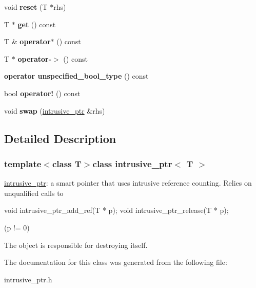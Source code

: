 \begin{DoxyCompactItemize}
\item 
\hypertarget{classintrusive__ptr_a81e2fb688afba02de9ecf2006caeb62e}{void {\bfseries reset} (T $\ast$rhs)}\label{classintrusive__ptr_a81e2fb688afba02de9ecf2006caeb62e}

\item 
\hypertarget{classintrusive__ptr_a70192c07e3ff5035942095a5d2d97c34}{T $\ast$ {\bfseries get} () const }\label{classintrusive__ptr_a70192c07e3ff5035942095a5d2d97c34}

\item 
\hypertarget{classintrusive__ptr_a63f7f0b02c547127f9f68ecdb01f7aa6}{T \& {\bfseries operator$\ast$} () const }\label{classintrusive__ptr_a63f7f0b02c547127f9f68ecdb01f7aa6}

\item 
\hypertarget{classintrusive__ptr_a4756c9e89a1a057e2c911d8224197d31}{T $\ast$ {\bfseries operator-\/$>$} () const }\label{classintrusive__ptr_a4756c9e89a1a057e2c911d8224197d31}

\item 
\hypertarget{classintrusive__ptr_a1a71711829594617e226fada9b7ef351}{{\bfseries operator unspecified\+\_\+bool\+\_\+type} () const }\label{classintrusive__ptr_a1a71711829594617e226fada9b7ef351}

\item 
\hypertarget{classintrusive__ptr_aee167762c6829dac96f664b4ab505e39}{bool {\bfseries operator!} () const }\label{classintrusive__ptr_aee167762c6829dac96f664b4ab505e39}

\item 
\hypertarget{classintrusive__ptr_a95826a79f706bc5c6b9fd28ae334e974}{void {\bfseries swap} (\hyperlink{classintrusive__ptr}{intrusive\+\_\+ptr} \&rhs)}\label{classintrusive__ptr_a95826a79f706bc5c6b9fd28ae334e974}

\end{DoxyCompactItemize}


\subsection{Detailed Description}
\subsubsection*{template$<$class T$>$class intrusive\+\_\+ptr$<$ T $>$}

\hyperlink{classintrusive__ptr}{intrusive\+\_\+ptr}\+: a smart pointer that uses intrusive reference counting. Relies on unqualified calls to 
\begin{DoxyPre}
     void intrusive\_ptr\_add\_ref(T * p);
     void intrusive\_ptr\_release(T * p);
\end{DoxyPre}
 (p != 0)

The object is responsible for destroying itself. 

The documentation for this class was generated from the following file\+:\begin{DoxyCompactItemize}
\item 
intrusive\+\_\+ptr.\+h\end{DoxyCompactItemize}
